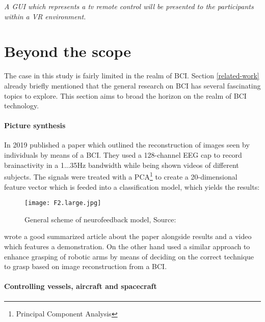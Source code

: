                 \medskip
                \emph{A GUI which represents a tv remote control will be presented to the participants within a VR environment.}
                \medskip

        \section{Beyond the scope}\label{beyond}

            The case in this study is fairly limited in the realm of BCI. Section \ref*{related-work} already briefly mentioned that the general research on BCI has several fascinating topics to explore. This section aims to broad the horizon on the realm of BCI technology.

            \paragraph{Picture synthesis}

                In 2019 \cite{Rashkov.2019} published a paper which outlined the reconstruction of images seen by individuals by means of a BCI. They used a 128-channel EEG cap to record brainactivity in a 1...35Hz bandwidth while being shown videos of different subjects. The signals were treated with a PCA\footnote{Principal Component Analysis} to create a 20-dimensional feature vector which is feeded into a classification model, which yields the results:

                \begin{figure}[h]     %
                    \centering
                    \texttt{[image: F2.large.jpg]} 
                    \caption{General scheme of neurofeedback model, Source: \cite{Rashkov.2019}}\label{image-synthesis}
                \end{figure}

                \cite{Oneill.14112019} wrote a good summarized article about the paper alongside results and a video which features a demonstration. On the other hand \cite{HernandezCarmona.2019} used a similar approach to enhance grasping of robotic arms by means of deciding on the correct technique to grasp based on image reconstruction from a BCI.

            \paragraph{Controlling vessels, aircraft and spacecraft}
                
